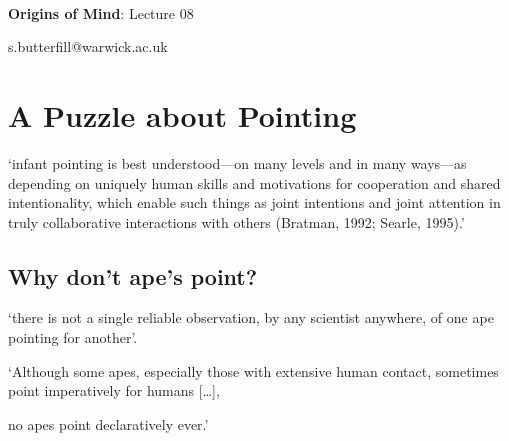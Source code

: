 \documentclass[12pt]{extarticle}
\date{}
\makeatletter
\def \ititle {Origins of Mind}
\def \isubtitle {Lecture 08}
\def \iemail{s.butterfill@warwick.ac.uk}
\makeatother
\begin{document}
\begin{multicols}{3}

\setlength\footnotesep{1em}









\def \ititle {Origins of Mind}
 
\def \isubtitle {Lecture 08}
 
 
 
\
 
 
 
\begin{center}
 
{\Large
 
\textbf{\ititle}: \isubtitle
 
}
 
 
 
\iemail %
 
\end{center}
 
 
 
\section{A Puzzle about Pointing}
 
‘infant pointing is best understood---on many levels and in many ways---as depending on uniquely human skills and motivations for cooperation and shared intentionality, which enable such things as joint intentions and joint attention in truly collaborative interactions with others (Bratman, 1992; Searle, 1995).’
\citep[p.\ 706]{Tomasello:2007fi}
 
\subsection{Why don’t ape’s point?}
 
‘there is not a single reliable observation, by any scientist anywhere, of one ape pointing for another’.
\citep[p.\ 507]{Tomasello:2010dy}
 
‘Although some apes, especially those with extensive human contact, sometimes point imperatively for humans […],
 
no apes point declaratively ever.’
\citep[p.\ 510]{Tomasello:2010dy}
 

\end{multicols}
\end{document}
